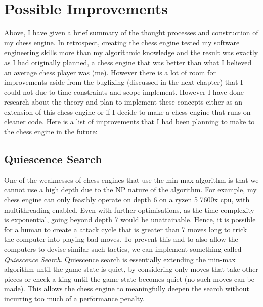 \chapter{Possible Improvements}
Above, I have given a brief summary of the thought processes and construction of my chess engine. In retrospect, creating the chess engine tested my software engineering skills more than my algorithmic knowledge and the result was exactly as I had originally planned, a chess engine that was better than what I believed an average chess player was (me). However there is a lot of room for improvements aside from the bugfixing (discussed in the next chapter) that I could not due to time constraints and scope implement. However I have done research about the theory and plan to implement these concepts either as an extension of this chess engine or if I decide to make a chess engine that runs on cleaner code. Here is a list of improvements that I had been planning to make to the chess engine in the future: 
\section{Quiescence Search}
One of the weaknesses of chess engines that use the min-max algorithm is that we cannot use a high depth due to the NP nature of the algorithm. For example, my chess engine can only feasibly operate on depth 6 on a ryzen 5 7600x cpu, with multithreading enabled. Even with further optimisations, as the time complexity is exponential, going beyond depth 7 would be unattainable. Hence, it is possible for a human to create a attack cycle that is greater than 7 moves long to trick the computer into playing bad moves. To prevent this and to also allow the computers to devise similar such tactics, we can implement something called \textit{Quiescence Search}. Quiescence search is essentially extending the min-max algorithm until the game state is quiet, by considering only moves that take other pieces or check a king until the game state becomes quiet (no such moves can be made). This allows the chess engine to meaningfully deepen the search without incurring too much of a performance penalty.
